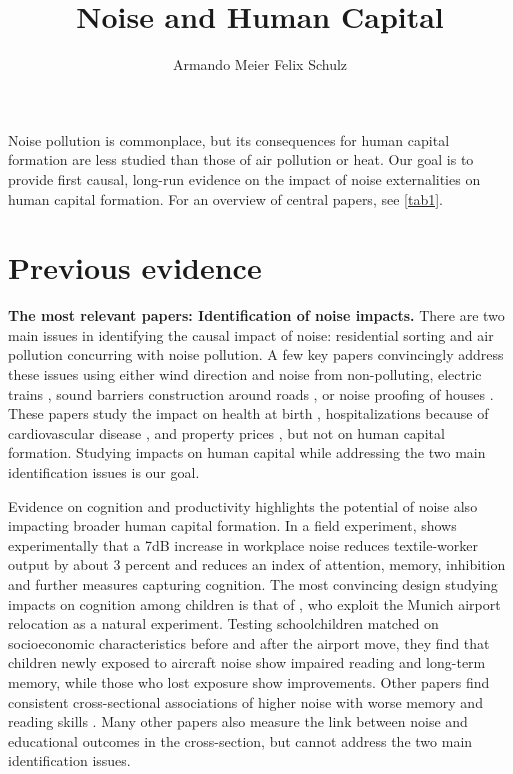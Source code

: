 \documentclass[11pt]{article}
\title{Noise and Human Capital}
\author{Armando Meier \qquad Felix Schulz}
\date{}
\makeatletter
\renewcommand{\maketitle}{%
  \par\begingroup
    \centering
    {\large\bfseries\@title\par}%
    \vspace{5pt}%
    {\small\@author\par}%
  \endgroup
  \vspace{6pt}%
}
\makeatother
\begin{document}
\maketitle

\vspace{0.5cm}


\thispagestyle{empty}

Noise pollution is commonplace, but its consequences for human capital formation are less studied than those of air pollution or heat. Our goal is to provide first causal, long-run evidence on the impact of noise externalities on human capital formation. For an overview of central papers, see \autoref{tab1}.

\section{Previous evidence}

{\bf{The most relevant papers: Identification of noise impacts.}} There are two main issues in identifying the causal impact of noise: residential sorting and air pollution concurring with noise pollution. A few key papers convincingly address these issues using either wind direction and noise from non-polluting, electric trains \parencite{greenhillNoisePollutionInfant2026}, sound barriers construction around roads \parencite{morettiTrafficNoiseExternality2025}, or noise proofing of houses \parencite{lindgrenSoundEnvironmentHealth2021}. These papers study the impact on health at birth \parencite{greenhillNoisePollutionInfant2026}, hospitalizations because of cardiovascular disease \parencite{lindgrenSoundEnvironmentHealth2021}, and property prices \parencite{morettiTrafficNoiseExternality2025}, but not on human capital formation. Studying impacts on human capital while addressing the two main identification issues is our goal. 

\bigskip

 Evidence on cognition and productivity highlights the potential of noise also impacting broader human capital formation. In a field experiment, \textcite{deanNoiseCognitiveFunction2024} shows experimentally that a 7dB increase in workplace noise reduces textile-worker output by about 3 percent and reduces an index of attention, memory, inhibition and further measures capturing cognition. The most convincing design studying impacts on cognition among children is that of \textcite{hyggeProspectiveStudyEffects2002}, who exploit the Munich airport relocation as a natural experiment. Testing schoolchildren matched on socioeconomic characteristics before and after the airport move, they find that children newly exposed to aircraft noise show impaired reading and long-term memory, while those who lost exposure show improvements. Other papers find consistent cross-sectional associations of higher noise with worse memory and reading skills \parencite{clarkEffectsRoadTraffic2010,hainesChronicAircraftNoise2001,klatteEffectsAircraftNoise2017,lercherAmbientNoiseCognitive2003}. Many other papers also measure the link between noise and educational outcomes in the cross-section, but cannot address the two main identification issues. 
\end{document}
